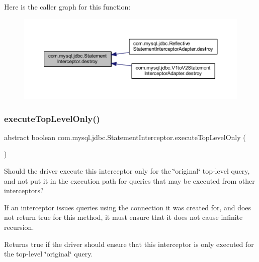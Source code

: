 Here is the caller graph for this function\+:
\nopagebreak
\begin{figure}[H]
\begin{center}
\leavevmode
\includegraphics[width=350pt]{interfacecom_1_1mysql_1_1jdbc_1_1_statement_interceptor_a5da9bea29735c87ac10a67c34dcee9ef_icgraph}
\end{center}
\end{figure}
\mbox{\label{interfacecom_1_1mysql_1_1jdbc_1_1_statement_interceptor_a445950e1035a2519be9d5fbaf1fe1b8c}} 
\subsubsection{\texorpdfstring{execute\+Top\+Level\+Only()}{executeTopLevelOnly()}}
{\footnotesize\ttfamily abstract boolean com.\+mysql.\+jdbc.\+Statement\+Interceptor.\+execute\+Top\+Level\+Only (\begin{DoxyParamCaption}{ }\end{DoxyParamCaption})\hspace{0.3cm}{\ttfamily [abstract]}}

Should the driver execute this interceptor only for the \char`\"{}original\char`\"{} top-\/level query, and not put it in the execution path for queries that may be executed from other interceptors?

If an interceptor issues queries using the connection it was created for, and does not return {\ttfamily true} for this method, it must ensure that it does not cause infinite recursion.

\begin{DoxyReturn}{Returns}
true if the driver should ensure that this interceptor is only executed for the top-\/level \char`\"{}original\char`\"{} query. 
\end{DoxyReturn}


